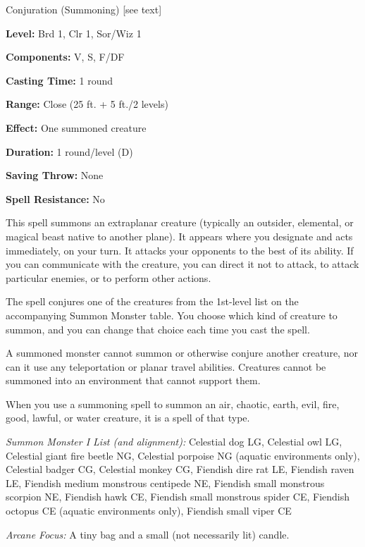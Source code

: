 
Conjuration (Summoning) [see text]

\textbf{Level:} Brd 1, Clr 1, Sor/Wiz 1

\textbf{Components:} V, S, F/DF

\textbf{Casting Time:} 1 round

\textbf{Range:} Close (25 ft. + 5 ft./2 levels)

\textbf{Effect:} One summoned creature

\textbf{Duration:} 1 round/level (D)

\textbf{Saving Throw:} None

\textbf{Spell Resistance:} No

This spell summons an extraplanar creature (typically an outsider, elemental, or 
magical beast native to another plane). It appears where you designate and acts 
immediately, on your turn. It attacks your opponents to the best of its ability. 
If you can communicate with the creature, you can direct it not to attack, to attack 
particular enemies, or to perform other actions.

The spell conjures one of the creatures from the 1st-level list on the accompanying 
Summon Monster table. You choose which kind of creature to summon, and you can 
change that choice each time you cast the spell.

A summoned monster cannot summon or otherwise conjure another creature, nor can 
it use any teleportation or planar travel abilities. Creatures cannot be summoned 
into an environment that cannot support them.

When you use a summoning spell to summon an air, chaotic, earth, evil, fire, good, 
lawful, or water creature, it is a spell of that type.

\textit{Summon Monster I List (and alignment):} Celestial dog LG, Celestial owl LG, Celestial giant fire beetle NG, Celestial porpoise NG (aquatic environments only), Celestial badger CG, Celestial monkey CG, Fiendish dire rat LE, Fiendish raven LE, Fiendish medium monstrous centipede NE, Fiendish small monstrous scorpion NE, Fiendish hawk CE, Fiendish small monstrous spider CE, Fiendish octopus CE (aquatic environments only), Fiendish small viper CE

\textit{Arcane Focus:} A tiny bag and a small (not necessarily lit) candle.

